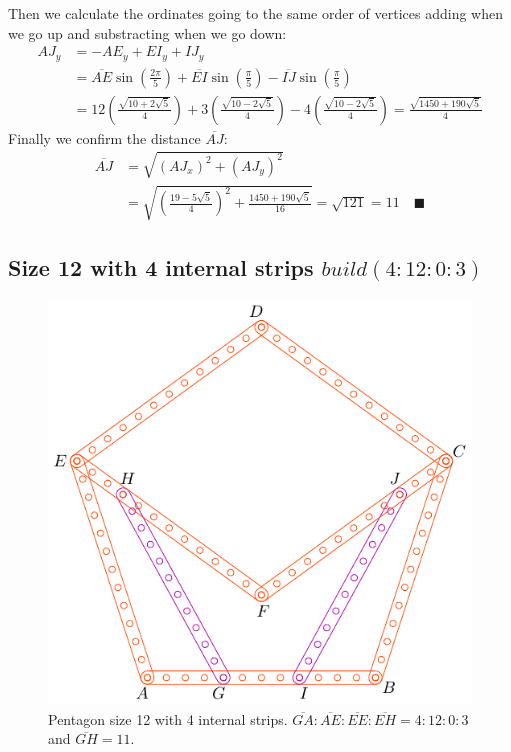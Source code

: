 \documentclass[11pt]{article}
\begin{document}
Then we calculate the ordinates going to the same order of vertices adding when we go up and substracting when we go down:
\begin{align}
AJ_y &= -AE_y + EI_y + IJ_y\nonumber\\
 &= \overline{AE}\sin\left(\frac{2\pi}5\right)
 + \overline{EI}\sin\left(\frac{\pi}5\right) 
 - \overline{IJ}\sin\left(\frac{\pi}5\right)\nonumber\\
 &= 12\left(\frac{\sqrt{10+2\sqrt5}}4\right)
 + 3\left(\frac{\sqrt{10-2\sqrt5}}4\right)
 - 4\left(\frac{\sqrt{10-2\sqrt5}}4\right)%
 = \frac{\sqrt{1450+190\sqrt5}}4
\end{align}
Finally we confirm the distance $\overline{AJ}$:
\begin{align}
\overline{AJ} &= \sqrt{(AJ_x)^2 + (AJ_y)^2}\nonumber\\
 &= \sqrt{\left(\frac{19-5\sqrt5}4\right)^2 + \frac{1450+190\sqrt5}{16}}%
 = \sqrt{121} = 11 \quad\blacksquare
\end{align}

\subsection{Size 12 with 4 internal strips $build(4:12:0:3)$}

\begin{figure}[h]
 \centering
 \includegraphics[scale=1.1]{12/penta12b}
 \caption{Pentagon size 12 with 4 internal strips. $\overline{GA}:\overline{AE}:\overline{EE}:\overline{EH} = 4:12:0:3$ and $\overline{GH}=11$.}
 \label{fig:penta12b}
\end{figure}
\end{document}

